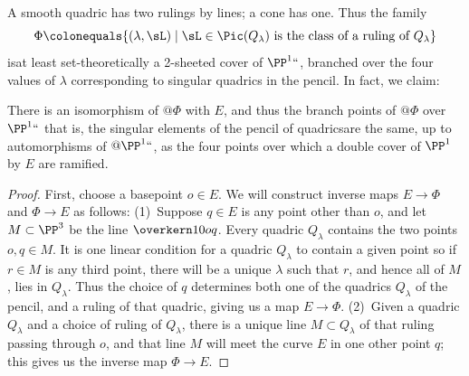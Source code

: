 A smooth quadric has two rulings by lines; a cone has one. Thus the
%
family
$$
\Phi \colonequals \{ (\lambda, \sL) \mid \sL \in \Pic(Q_\lambda) \text{ is the class of a ruling of } Q_\lambda \}
$$
is\emdash at least
set-theoretically\emdash
{}%
a 2-sheeted cover of $\PP^1` `$,
%
branched over the four values of $\lambda$ corresponding to singular
quadrics in the pencil. In fact, we claim:
%
%

\begin{proposition}\label{rulings on pencil}
There is an isomorphism of $@\Phi$ with $E$, and thus the branch points
of $@\Phi$ over $\PP^1` `$\emdash
that is, the singular elements of
the pencil of quadrics\emdash are the same, up to automorphisms of
$@\PP^1` `$, as the four points over which a double cover of $\PP^1$ by $E$
are ramified.
\unif
\end{proposition}

\begin{proof}
First, choose a basepoint $o \in E$. We will construct inverse maps $E \to \Phi$ and $\Phi \to E$ as follows:
\smallbreak\noindent
(1)\,
Suppose $q \in E$ is any point other than $o$, and let
$M\subset \PP^3$ be the line $\overkern10{oq}$.
Every quadric $Q_\lambda$ contains the two points $o, q \in M$. It is one linear condition
for a quadric $Q_{\lambda}$ to contain a given point  so if $r\in M$ is any third point, there will be a unique $\lambda$ such that $r$, and hence all of $M$, lies in $Q_\lambda$. Thus the choice of $q$ determines both one of the quadrics $Q_\lambda$ of the pencil, and a ruling of that quadric, giving us a map $E \to \Phi$.
\smallbreak\noindent
(2)\,
Given a quadric $Q_\lambda$ and a choice of ruling of $Q_\lambda$, there is a unique line $M \subset Q_\lambda$ of that ruling passing through $o$, and that line $M$ will meet the curve $E$ in one other point $q$; this gives us the inverse map $\Phi \to E$.
\end{proof}

